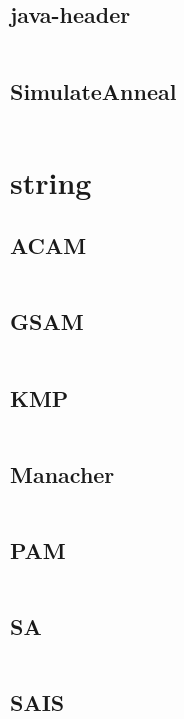 \documentclass[a4]{article}
\begin{document}
\subsection{java-header}
\inputminted[mathescape,linenos,numbersep=5pt,frame=lines,framesep=2mm]{java}{src/other/java-header.java}
\subsection{SimulateAnneal}
\inputminted[mathescape,linenos,numbersep=5pt,frame=lines,framesep=2mm]{cpp}{src/other/SimulateAnneal.cpp}
\section{string}
\subsection{ACAM}
\inputminted[mathescape,linenos,numbersep=5pt,frame=lines,framesep=2mm]{cpp}{src/string/ACAM.cpp}
\subsection{GSAM}
\inputminted[mathescape,linenos,numbersep=5pt,frame=lines,framesep=2mm]{cpp}{src/string/GSAM.cpp}
\subsection{KMP}
\inputminted[mathescape,linenos,numbersep=5pt,frame=lines,framesep=2mm]{cpp}{src/string/KMP.cpp}
\subsection{Manacher}
\inputminted[mathescape,linenos,numbersep=5pt,frame=lines,framesep=2mm]{cpp}{src/string/Manacher.cpp}
\subsection{PAM}
\inputminted[mathescape,linenos,numbersep=5pt,frame=lines,framesep=2mm]{cpp}{src/string/PAM.cpp}
\subsection{SA}
\inputminted[mathescape,linenos,numbersep=5pt,frame=lines,framesep=2mm]{cpp}{src/string/SA.cpp}
\subsection{SAIS}
\inputminted[mathescape,linenos,numbersep=5pt,frame=lines,framesep=2mm]{cpp}{src/string/SAIS.cpp}
\end{document}
